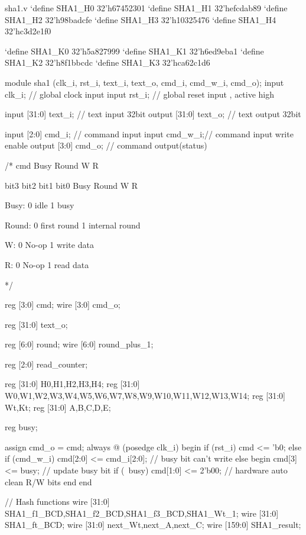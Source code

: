 \begin{chunk}{sha1.v}
`define SHA1_H0 32'h67452301
`define SHA1_H1 32'hefcdab89
`define SHA1_H2 32'h98badcfe
`define SHA1_H3 32'h10325476
`define SHA1_H4 32'hc3d2e1f0

`define SHA1_K0 32'h5a827999
`define SHA1_K1 32'h6ed9eba1
`define SHA1_K2 32'h8f1bbcdc
`define SHA1_K3 32'hca62c1d6

module sha1 (clk_i, rst_i, text_i, text_o, cmd_i, cmd_w_i, cmd_o);
  input    clk_i;   // global clock input
  input    rst_i;   // global reset input , active high
  
  input  [31:0]  text_i;  // text input 32bit
  output  [31:0]  text_o;  // text output 32bit
  
  input  [2:0]  cmd_i;  // command input
  input    cmd_w_i;// command input write enable
  output  [3:0]  cmd_o;  // command output(status)

  /*
    cmd
    Busy Round W R

    bit3 bit2  bit1 bit0
    Busy Round W    R
    
    Busy:
    0  idle
    1  busy
    
    Round:
    0  first round
    1  internal round
    
    W:
    0       No-op
    1  write data
    
    R:
    0  No-op
    1  read data
      
  */
  

      reg  [3:0]  cmd;
      wire  [3:0]  cmd_o;
      
      reg  [31:0]  text_o;
      
      reg  [6:0]  round;
      wire  [6:0]  round_plus_1;
      
      reg  [2:0]  read_counter;
      
      reg  [31:0]  H0,H1,H2,H3,H4;
      reg  [31:0]  W0,W1,W2,W3,W4,W5,W6,W7,W8,W9,W10,W11,W12,W13,W14;
      reg  [31:0]  Wt,Kt;
      reg  [31:0]  A,B,C,D,E;

      reg    busy;
      
      assign cmd_o = cmd;
      always @ (posedge clk_i)
      begin
        if (rst_i)
          cmd <= 'b0;
        else
        if (cmd_w_i)
          cmd[2:0] <= cmd_i[2:0];    // busy bit can't write
        else
        begin
          cmd[3] <= busy;      // update busy bit
          if (~busy)
            cmd[1:0] <= 2'b00;  // hardware auto clean R/W bits
        end
      end
      
      // Hash functions
  wire [31:0] SHA1_f1_BCD,SHA1_f2_BCD,SHA1_f3_BCD,SHA1_Wt_1;
  wire [31:0] SHA1_ft_BCD;
  wire [31:0] next_Wt,next_A,next_C;
  wire [159:0] SHA1_result;
  

\end{chunk}
